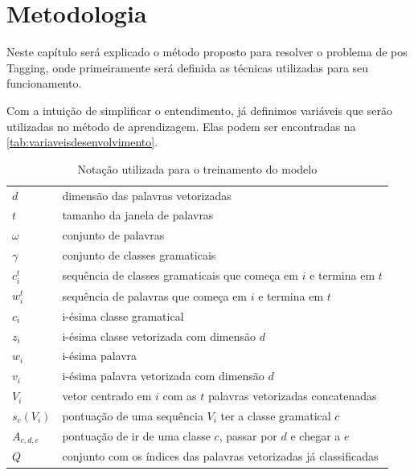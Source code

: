 \chapter{Metodologia}\label{desenvolvimento}

Neste capítulo será explicado o método proposto para resolver o problema de \ac{pos} Tagging, onde primeiramente será definida as técnicas utilizadas para seu funcionamento.

Com a intuição de simplificar o entendimento, já definimos variáveis que serão utilizadas no método de aprendizagem. Elas podem ser encontradas na \autoref{tab:variaveisdesenvolvimento}.

\begin{table}[!htb]
\caption{Notação utilizada para o treinamento do modelo} \label{tab:variaveisdesenvolvimento}
\begin{center}
\begin{tabular}{m{2cm}m{12.0cm}}
  \toprule
  $d$		& dimensão das palavras vetorizadas \\
  $t$		& tamanho da janela de palavras \\
  $\omega$	& conjunto de palavras \\
  $\gamma$  & conjunto de classes gramaticais \\
  $c_i^t$  & sequência de classes gramaticais que começa em $i$ e termina em $t$ \\
  $w_i^t$  & sequência de palavras que começa em $i$ e termina em $t$ \\
  $c_i$		& i-ésima classe gramatical \\
  $z_i$		& i-ésima classe vetorizada com dimensão $d$ \\ 
  $w_i$		& i-ésima palavra\\
  $v_i$		& i-ésima palavra vetorizada com dimensão $d$ \\
  $V_i$		& vetor centrado em $i$ com as $t$ palavras vetorizadas concatenadas \\
  $s_c(V_i)$ & pontuação de uma sequência $V_i$ ter a classe gramatical $c$ \\
  $A_{c,d,e}$ & pontuação de ir de uma classe $c$, passar por $d$ e chegar a $e$ \\
  $Q$	&	conjunto com os índices das palavras vetorizadas já classificadas \\
  \bottomrule
\end{tabular}
\end{center}

\end{table}



